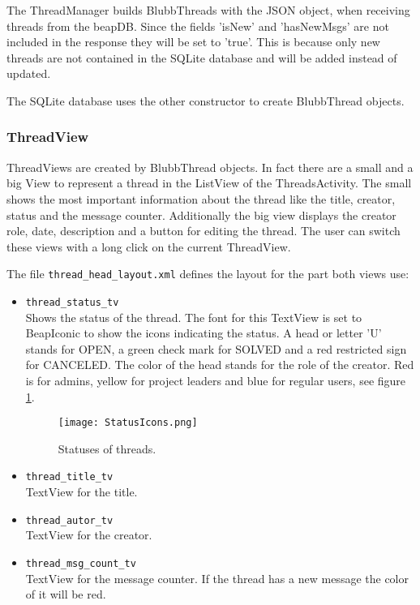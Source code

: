 \documentclass[12pt,a4paper,oneside]{report}
\newcommand{\code}[1]{\lstinline{#1}}
\begin{document}
The ThreadManager builds BlubbThreads with the JSON object, when receiving threads from the beapDB. Since the fields 'isNew' and 'hasNewMsgs' are not included in the response they will be set to 'true'. This is because only new threads are not contained in the SQLite database and will be added instead of updated. 

The SQLite database uses the other constructor to create BlubbThread objects.

\subsubsection{ThreadView}
ThreadViews are created by BlubbThread objects. In fact there are a small and a big View to represent a thread in the ListView of the ThreadsActivity. 
The small shows the most important information about the thread like the title, creator, status and the message counter. Additionally the big view displays the creator role, date, description and a button for editing the thread. The user can switch these views with a long click on the current ThreadView. 

The file \code{thread_head_layout.xml} defines the layout for the part both views use:
\begin{itemize}
\item \code{thread_status_tv}\\
Shows the status of the thread. The font for this TextView is set to BeapIconic to show the icons indicating the status. A head or letter 'U' stands for OPEN, a green check mark for SOLVED and a red restricted sign for CANCELED. The color of the head stands for the role of the creator. Red is for admins, yellow for project leaders and blue for regular users, see figure \ref{fig:ThreadStatusIcons}. 
\begin{figure}[!ht]
	\centering
    \texttt{[image: StatusIcons.png]}
	\caption{Statuses of threads.}
	\label{fig:ThreadStatusIcons}
\end{figure}

\item \code{thread_title_tv}\\
TextView for the title.

\item \code{thread_autor_tv}\\
TextView for the creator.

\item \code{thread_msg_count_tv}\\
TextView for the message counter. If the thread has a new message the color of it will be red.

\end{itemize}
\end{document}

